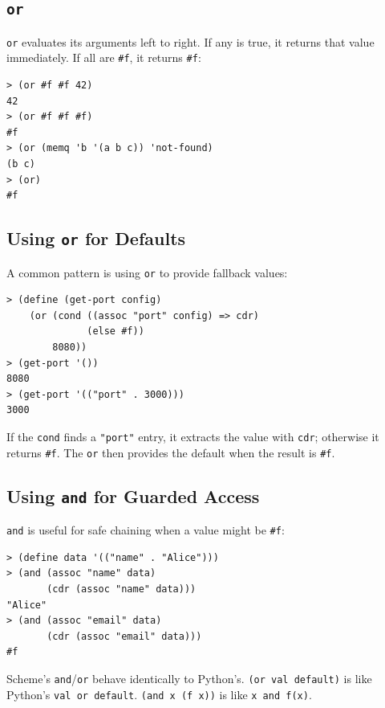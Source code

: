 \subsection{\texttt{or}}

\texttt{or} evaluates its arguments left to right. If any is true, it returns that value immediately. If all are \texttt{\#f}, it returns \texttt{\#f}:

\begin{lstlisting}[style=repl]
> (or #f #f 42)
42
> (or #f #f #f)
#f
> (or (memq 'b '(a b c)) 'not-found)
(b c)
> (or)
#f
\end{lstlisting}

\subsection{Using \texttt{or} for Defaults}

A common pattern is using \texttt{or} to provide fallback values:

\begin{lstlisting}[style=repl]
> (define (get-port config)
    (or (cond ((assoc "port" config) => cdr)
              (else #f))
        8080))
> (get-port '())
8080
> (get-port '(("port" . 3000)))
3000
\end{lstlisting}

If the \texttt{cond} finds a \texttt{"port"} entry, it extracts the value with \texttt{cdr}; otherwise it returns \texttt{\#f}. The \texttt{or} then provides the default when the result is \texttt{\#f}.

\subsection{Using \texttt{and} for Guarded Access}

\texttt{and} is useful for safe chaining when a value might be \texttt{\#f}:

\begin{lstlisting}[style=repl]
> (define data '(("name" . "Alice")))
> (and (assoc "name" data)
       (cdr (assoc "name" data)))
"Alice"
> (and (assoc "email" data)
       (cdr (assoc "email" data)))
#f
\end{lstlisting}

\begin{note}
Scheme's \texttt{and}/\texttt{or} behave identically to Python's. \texttt{(or val default)} is like Python's \texttt{val or default}. \texttt{(and x (f x))} is like \texttt{x and f(x)}.
\end{note}

